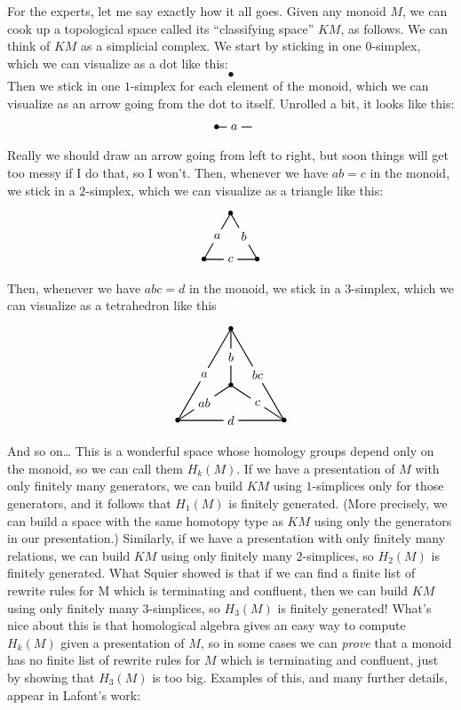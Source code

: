 \documentclass{article}
\begin{document}
For the experts, let me say exactly how it all goes. Given any monoid
\(M\), we can cook up a topological space called its ``classifying
space'' \(KM\), as follows. We can think of \(KM\) as a simplicial
complex. We start by sticking in one 0-simplex, which we can visualize
as a dot like this: \[\bullet\] Then we stick in one \(1\)-simplex for
each element of the monoid, which we can visualize as an arrow going
from the dot to itself. Unrolled a bit, it looks like this: \[
  \begin{tikzpicture}
    \draw[thick] (0,0) node{$\bullet$} to node[fill=white]{$a$} (1,0);
  \end{tikzpicture}
\] Really we should draw an arrow going from left to right, but soon
things will get too messy if I do that, so I won't. Then, whenever we
have \(ab = c\) in the monoid, we stick in a \(2\)-simplex, which we can
visualize as a triangle like this: \[
  \begin{tikzpicture}
    \draw[thick] (0,0) node{$\bullet$} to node[fill=white]{$c$} (1.5,0) node{$\bullet$} to node[fill=white]{$b$} (0.75,1.3) node{$\bullet$} to node[fill=white]{$a$} cycle;
  \end{tikzpicture}
\] Then, whenever we have \(abc = d\) in the monoid, we stick in a
\(3\)-simplex, which we can visualize as a tetrahedron like this \[
  \begin{tikzpicture}
    \draw[thick] (0,0) node{$\bullet$} to node[fill=white]{$d$} (3,0) node{$\bullet$} to node[fill=white]{$bc$} (1.5,2.6) node{$\bullet$} to node[fill=white]{$a$} cycle;
    \draw[thick] (0,0) to node[fill=white]{$ab$} (1.5,1) node{$\bullet$};
    \draw[thick] (1.5,2.6) to node[fill=white]{$b$} (1.5,1);
    \draw[thick] (3,0) to node[fill=white]{$c$} (1.5,1);
  \end{tikzpicture}
\] And so on\ldots{} This is a wonderful space whose homology groups
depend only on the monoid, so we can call them \(H_k(M)\). If we have a
presentation of \(M\) with only finitely many generators, we can build
\(KM\) using \(1\)-simplices only for those generators, and it follows
that \(H_1(M)\) is finitely generated. (More precisely, we can build a
space with the same homotopy type as \(KM\) using only the generators in
our presentation.) Similarly, if we have a presentation with only
finitely many relations, we can build \(KM\) using only finitely many
\(2\)-simplices, so \(H_2(M)\) is finitely generated. What Squier showed
is that if we can find a finite list of rewrite rules for M which is
terminating and confluent, then we can build \(KM\) using only finitely
many \(3\)-simplices, so \(H_3(M)\) is finitely generated! What's nice
about this is that homological algebra gives an easy way to compute
\(H_k(M)\) given a presentation of \(M\), so in some cases we can
\emph{prove} that a monoid has no finite list of rewrite rules for \(M\)
which is terminating and confluent, just by showing that \(H_3(M)\) is
too big. Examples of this, and many further details, appear in Lafont's
work:
\end{document}
